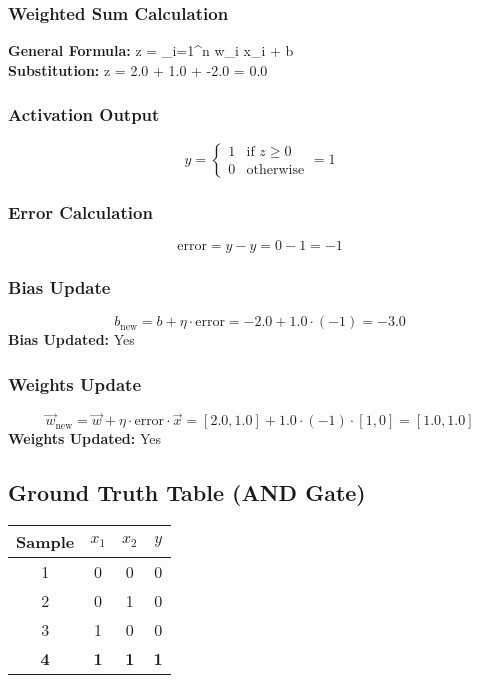 \documentclass{article}
\begin{document}
\subsubsection*{Weighted Sum Calculation}
\textbf{General Formula:} \quad
z = \sum_{i=1}^{n} w_i x_i + b
\\
\textbf{Substitution:} \quad
z = 2.0  + 1.0  + -2.0 = 0.0

\subsubsection*{Activation Output}
\[
\hat{y} =
\begin{cases}
1 & \text{if } z \geq 0 \\
0 & \text{otherwise}
\end{cases}
= 1
\]

\subsubsection*{Error Calculation}
\[
\text{error} = y - \hat{y} = 0 - 1 = -1
\]

\subsubsection*{Bias Update}
\[
b_{\text{new}} = b + \eta \cdot \text{error} = -2.0 + 1.0 \cdot (-1) = -3.0
\]
\textbf{Bias Updated:} Yes

\subsubsection*{Weights Update}
\[
\vec{w}_{\text{new}} = \vec{w} + \eta \cdot \text{error} \cdot \vec{x} = 
[2.0, 1.0] + 1.0 \cdot (-1) \cdot [1, 0] = 
[1.0, 1.0]
\]
\textbf{Weights Updated:} Yes

\subsection*{Ground Truth Table (AND Gate)}
\begin{center}
\begin{tabular}{|c|c|c|c|}
\hline
\textbf{Sample} & $x_1$ & $x_2$ & $y$ \\
\hline
1 & 0 & 0 & 0 \\
\hline
2 & 0 & 1 & 0 \\
\hline
3 & 1 & 0 & 0 \\
\hline
\rowcolor{yellow} \textbf{4} & \textbf{1} & \textbf{1} & \textbf{1} \\
\hline
\end{tabular}
\end{center}
\end{document}
